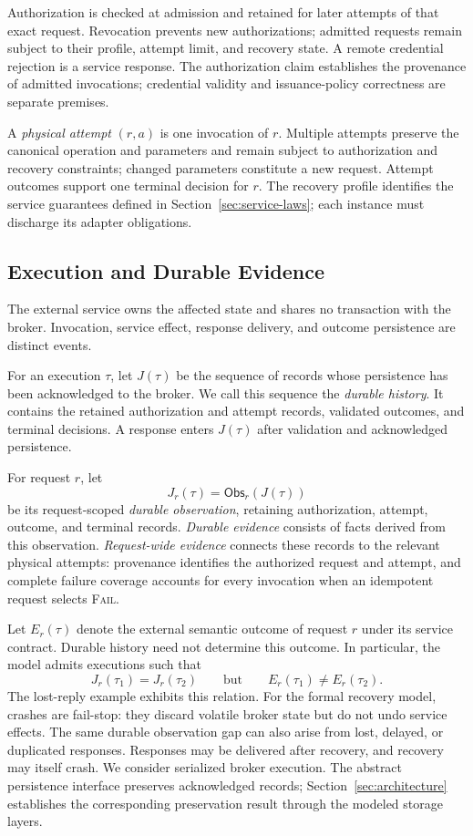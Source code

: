 \documentclass[acmsmall,screen,review,anonymous]{acmart}
\newcommand{\Fail}{\textsc{Fail}\xspace}
\begin{document}
Authorization is checked at admission and retained for later attempts of
that exact request. Revocation prevents new authorizations; admitted
requests remain subject to their profile, attempt limit, and recovery state.
A remote credential rejection is a service response. The authorization
claim establishes the provenance of admitted invocations; credential
validity and issuance-policy correctness are separate premises.

A \emph{physical attempt} $(r,a)$ is one invocation of $r$. Multiple
attempts preserve the canonical operation and parameters and remain
subject to authorization and recovery constraints; changed parameters
constitute a new request. Attempt outcomes support one terminal decision
for $r$. The recovery profile identifies the service guarantees defined
in Section~\ref{sec:service-laws}; each instance must discharge its adapter obligations.

\subsection{Execution and Durable Evidence}

The external service owns the affected state and shares no transaction
with the broker. Invocation, service effect, response delivery, and
outcome persistence are distinct events.

For an execution $\tau$, let $J(\tau)$ be the sequence of records whose
persistence has been acknowledged to the broker. We call this sequence the
\emph{durable history}. It contains the retained authorization and attempt
records, validated outcomes, and terminal decisions. A response enters
$J(\tau)$ after validation and acknowledged persistence.

For request $r$, let
\[
  J_r(\tau)=\mathsf{Obs}_r(J(\tau))
\]
be its request-scoped \emph{durable observation}, retaining authorization,
attempt, outcome, and terminal records. \emph{Durable evidence} consists
of facts derived from this observation. \emph{Request-wide evidence}
connects these records to the relevant physical attempts: provenance
identifies the authorized request and attempt, and complete failure
coverage accounts for every invocation when an idempotent request selects \Fail.

Let $E_r(\tau)$ denote the external semantic outcome of request $r$
under its service contract. Durable history need not determine this
outcome. In particular, the model admits executions such that
\[
  J_r(\tau_1)=J_r(\tau_2)
  \qquad\text{but}\qquad
  E_r(\tau_1)\ne E_r(\tau_2).
\]
The lost-reply example exhibits this relation.
For the formal recovery model, crashes are fail-stop: they discard volatile
broker state but do not undo service effects. The same durable observation gap
can also arise from lost, delayed, or duplicated responses. Responses may be
delivered after recovery, and recovery may itself crash.
We consider serialized broker execution. The abstract persistence
interface preserves acknowledged records; Section~\ref{sec:architecture} establishes the
corresponding preservation result through the modeled storage layers.
\end{document}
